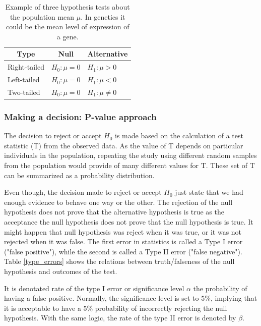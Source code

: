 \begin{table}[h!]
\centering
\caption[Hypothesis tests]{Example of three hypothesis tests about the population mean $\mu$. In genetics it could be the mean level of expression of a gene.}
\label{hypothesis-tests}
\begin{tabular}{@{}lll@{}}
\toprule
\multicolumn{1}{c}{\textbf{Type}} & \multicolumn{1}{c}{\textbf{Null}} & \multicolumn{1}{c}{\textbf{Alternative}} \\ \midrule
Right-tailed & $H_{0}:\mu = 0$ & $H_{1}: \mu >  0 $  \\
Left-tailed & $H_{0}:\mu = 0$ & $H_{1}: \mu <  0 $  \\
Two-tailed & $H_{0}:\mu = 0$ & $H_{1}: \mu \neq 0 $ \\ \bottomrule
\end{tabular}
\end{table}

\subsubsection{Making a decision: P-value approach}

The decision to reject or accept $H_0$ is made based on the calculation of a test statistic (T) from the observed data.
As the value of T depends on particular individuals in the population, repeating the study
using  different random samples from the population would provide of many different values for T.
These set of T can be summarized as a probability distribution.

Even though, the decision made to reject or accept $H_0$ just state that we had
enough evidence to behave one way or the other.
The rejection of the null hypothesis does not prove that the alternative hypothesis is true as
the acceptance the null hypothesis does not prove that the null hypothesis is true.
It might happen that null hypothesis was reject when it was true, or it was not
rejected when it was false. The first error in statistics is called a Type I error ("false positive"),
 while the second is called a Type II error ("false negative").
Table \ref{type_errors} shows the relations between truth/falseness of the null hypothesis and outcomes of the test.

It is denotated  rate of the type I error  or significance level
$\alpha$ the probability of having a false positive.
Normally, the significance level is set to 5\%, implying that it is acceptable to have a 5\%
probability of incorrectly rejecting the null hypothesis. With the same logic, the rate of the
type II error is denoted by $\beta$.

